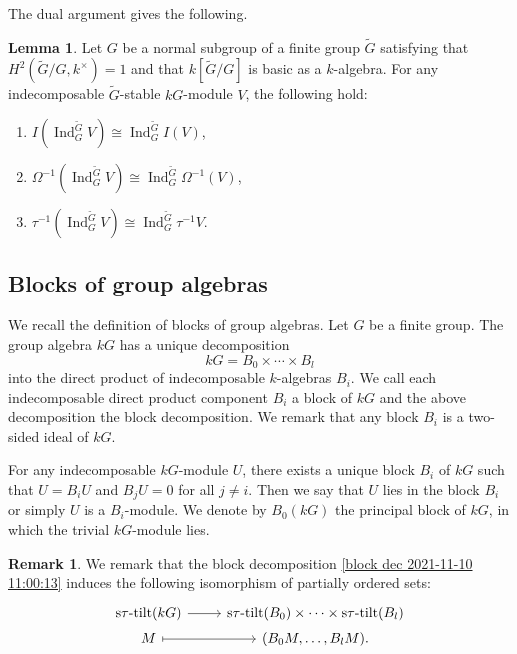 \documentclass[pdftex,a4paper]{article}
\numberwithin{equation}{subsection}
\theoremstyle{definition}
\newtheorem{lemma}[theorem]{Lemma}
\newtheorem{remark}[theorem]{Remark}
\newcommand{\induc}{{\operatorname{Ind}\nolimits}}
\newcommand{\stautilt}{\operatorname{\mathrm{s\tau-tilt}}}
\begin{document}
The dual argument gives the following.
\begin{lemma}\label{induction functor inj env 2021-09-07 12:06:47}
	Let \(G\) be a normal subgroup of a finite group \(\tilde{G}\) satisfying that \(H^2(\tilde{G}/G,k^\times)=1\) and that \(k[\tilde{G}/G]\) is basic as a \(k\)-algebra.
	For any indecomposable \(\tilde{G}\)-stable \(kG\)-module \(V\), the following hold:
	\begin{enumerate}
		\item \(I(\induc_G^{\tilde{G}} V)\cong \induc_G^{\tilde{G}} I (V)\),\label{2021-10-01 15:13:53}
		\item \(\Omega^{-1} (\induc_G^{\tilde{G}} V)\cong \induc_G^{\tilde{G}} \Omega^{-1} (V)\),\label{2021-10-01 15:13:57}
		\item \(\tau^{-1}(\induc_G^{\tilde{G}} V)\cong \induc_G^{\tilde{G}} \tau^{-1} V\).\label{2021-10-01 15:14:01}
	\end{enumerate}
\end{lemma}

\subsection{Blocks of group algebras}

We recall the definition of blocks of group algebras. Let \(G\) be a finite group. The group algebra \(kG\) has a unique decomposition
\begin{equation}\label{block dec 2021-11-10 11:00:13}
	kG=B_0\times \cdots \times B_l
\end{equation}
into the direct product of indecomposable \(k\)-algebras \(B_i\).
We call each indecomposable direct product component \(B_i\) a block of \(kG\) and the above decomposition the block decomposition. We remark that any block \(B_i\) is a two-sided ideal of \(kG\).

For any indecomposable \(kG\)-module \(U\), there exists a unique block \(B_i\) of \(kG\) such that \(U=B_iU\) and \(B_jU=0\) for all \(j\neq i\). Then we say that \(U\) lies in the block \(B_i\) or simply \(U\) is a \(B_i\)-module.
We denote by \(B_0(kG)\) the principal block of \(kG\), in which the trivial \(kG\)-module lies.

\begin{remark}
	We remark that the block decomposition \eqref{block dec 2021-11-10 11:00:13} induces the following isomorphism of partially ordered sets:
	\begin{equation}
		\begin{tikzcd}[row sep=1pt]
			\stautilt(kG)\ar[r]& \stautilt(B_0)\times\cdots\times\stautilt(B_l)\\
			M\ar[r,mapsto]&(B_0 M, \ldots, B_l M).
		\end{tikzcd}
	\end{equation}
\end{remark}
\end{document}
